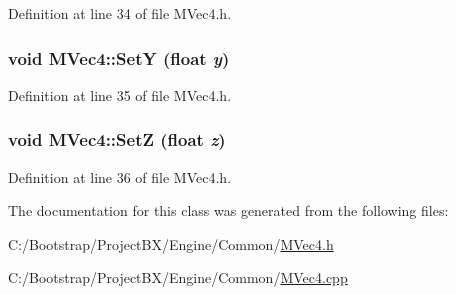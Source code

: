 Definition at line 34 of file MVec4.h.\hypertarget{class_m_vec4_d887bfc35b445c716dfc6083ee23ba1c}{
\subsubsection[{SetY}]{\setlength{\rightskip}{0pt plus 5cm}void MVec4::SetY (float {\em y})}}
\label{class_m_vec4_d887bfc35b445c716dfc6083ee23ba1c}




Definition at line 35 of file MVec4.h.\hypertarget{class_m_vec4_1f9eddb57a0fc49bcf4f90b5378ddd2a}{
\subsubsection[{SetZ}]{\setlength{\rightskip}{0pt plus 5cm}void MVec4::SetZ (float {\em z})}}
\label{class_m_vec4_1f9eddb57a0fc49bcf4f90b5378ddd2a}




Definition at line 36 of file MVec4.h.

The documentation for this class was generated from the following files:\begin{CompactItemize}
\item 
C:/Bootstrap/ProjectBX/Engine/Common/\hyperlink{_m_vec4_8h}{MVec4.h}\item 
C:/Bootstrap/ProjectBX/Engine/Common/\hyperlink{_m_vec4_8cpp}{MVec4.cpp}\end{CompactItemize}
